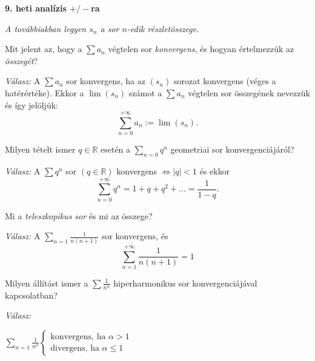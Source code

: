 \documentclass[a4paper,12pt]{article}
\begin{document}
	\pagestyle{empty}
	\def\Z{\mathbb{Z}}
	\def\Q{\mathbb{Q}}
	\def\R{\mathbb{R}}
	\def\Ra{\overline{\mathbb{R}}}
	\def\C{\mathbb{C}}
	\def\N{\mathbb{N}}
	\def\a{\textbf{Állítás: }}
	\def\t{\textbf{Tétel: }}
	\def\k{\textbf{Következmény: }}
	\def\d{\textbf{Definíció: }}
	\def\m{\emph{Megjegyzés: }}
	\def\p{\textsl{Példa: }}
	\def\b{\emph{Bizonyítás: }}
	
	\begin{center}
		\textbf{9. heti analízis $+/-$ra}
	\end{center}
	
	\emph{A továbbiakban legyen $s_n$ a sor $n$-edik részletösszege.}
	
	\bigskip
	\begin{compactenum}
		
		\item Mit jelent az, hogy a $\sum a_n$ végtelen sor \emph{konvergens}, és hogyan értelmezzük az \emph{összegét}?
		
		\emph{Válasz: } A $\sum a_n$ sor konvergens, ha az $(s_n)$ sorozat konvergens (véges a hatérértéke). Ekkor a $\lim(s_n)$ számot a $\sum a_n$ végtelen sor összegének nevezzük és így jelöljük: \[\sum_{n=0}^{+\infty} a_n:=\lim(s_n). \]
		
		\bigskip 
		\item Milyen tételt ismer $q \in \R$ esetén a $\sum_{n=0} q^n $ geometriai sor konvergenciájáról?
		
		\emph{Válasz: } A $\displaystyle \sum q^n$ sor $(q \in \R) $ konvergens $\Leftrightarrow |q| <1$ és ekkor 
		\[\sum_{n=0}^{+\infty} q^n=1+q+q^2+\ldots = \frac{1}{1-q}. \]
		
		\bigskip 
		\item Mi a \emph{teleszkopikus sor} és mi az összege?
		
		\emph{Válasz: } A $\sum_{n=1} \frac{1}{n(n+1)}$ sor konvergens, és
		\[ \sum_{n=1}^{+\infty}\frac{1}{n(n+1)}=1 \]
		
		\bigskip 
		\item Milyen állítást ismer a $\sum\frac{1}{n^\alpha}$ hiperharmonikus sor konvergenciájával kapcsolatban?
		
		\emph{Válasz: } 
		\begin{center}
			$\displaystyle \sum_{n=1}\frac{1}{n^\alpha} \left\{\begin{gathered}
			\text{konvergens, ha } \alpha>1 \\
			\text{divergens, ha } \alpha\leq 1
			\end{gathered}\right.$
		\end{center}
		

\end{compactenum}
\end{document}
